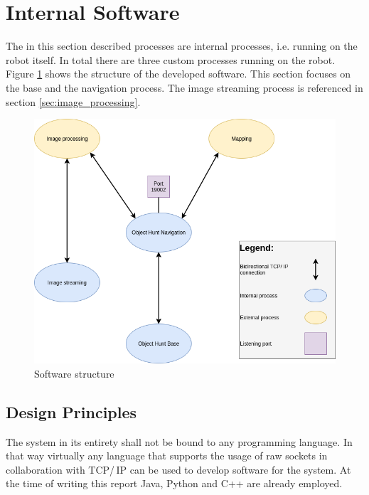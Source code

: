 \newpage

\section{Internal Software}

The in this section described processes are internal processes, i.e. running on the robot itself. In total there are three custom processes running on the robot. Figure \ref{fig:software} shows the structure of the developed software. This section focuses on the base and the navigation process. The image streaming process is referenced in section \ref{sec:image_processing}.

\begin{figure}[H]
\centering
\includegraphics[scale=0.6]{sources/software_structure.png}
\caption[Software structure]{Software structure}
\label{fig:software}
\end{figure}

\subsection{Design Principles}\label{subsec:design_principles}

The system in its entirety shall not be bound to any programming language. In that way virtually any language that supports the usage of raw sockets in collaboration with TCP/\,IP can be used to develop software for the system. At the time of writing this report Java, Python and C++ are already employed.\\

